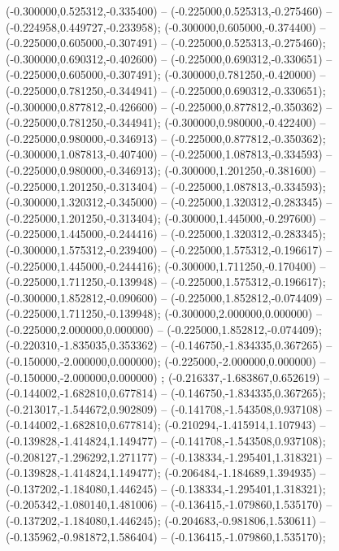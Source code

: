 (-0.300000,0.525312,-0.335400) -- (-0.225000,0.525313,-0.275460) -- (-0.224958,0.449727,-0.233958);
 (-0.300000,0.605000,-0.374400) -- (-0.225000,0.605000,-0.307491) -- (-0.225000,0.525313,-0.275460);
 (-0.300000,0.690312,-0.402600) -- (-0.225000,0.690312,-0.330651) -- (-0.225000,0.605000,-0.307491);
 (-0.300000,0.781250,-0.420000) -- (-0.225000,0.781250,-0.344941) -- (-0.225000,0.690312,-0.330651);
 (-0.300000,0.877812,-0.426600) -- (-0.225000,0.877812,-0.350362) -- (-0.225000,0.781250,-0.344941);
 (-0.300000,0.980000,-0.422400) -- (-0.225000,0.980000,-0.346913) -- (-0.225000,0.877812,-0.350362);
 (-0.300000,1.087813,-0.407400) -- (-0.225000,1.087813,-0.334593) -- (-0.225000,0.980000,-0.346913);
 (-0.300000,1.201250,-0.381600) -- (-0.225000,1.201250,-0.313404) -- (-0.225000,1.087813,-0.334593);
 (-0.300000,1.320312,-0.345000) -- (-0.225000,1.320312,-0.283345) -- (-0.225000,1.201250,-0.313404);
 (-0.300000,1.445000,-0.297600) -- (-0.225000,1.445000,-0.244416) -- (-0.225000,1.320312,-0.283345);
 (-0.300000,1.575312,-0.239400) -- (-0.225000,1.575312,-0.196617) -- (-0.225000,1.445000,-0.244416);
 (-0.300000,1.711250,-0.170400) -- (-0.225000,1.711250,-0.139948) -- (-0.225000,1.575312,-0.196617);
 (-0.300000,1.852812,-0.090600) -- (-0.225000,1.852812,-0.074409) -- (-0.225000,1.711250,-0.139948);
 (-0.300000,2.000000,0.000000) -- (-0.225000,2.000000,0.000000) -- (-0.225000,1.852812,-0.074409);
 (-0.220310,-1.835035,0.353362) -- (-0.146750,-1.834335,0.367265) -- (-0.150000,-2.000000,0.000000);
 (-0.225000,-2.000000,0.000000) -- (-0.150000,-2.000000,0.000000) ;
 (-0.216337,-1.683867,0.652619) -- (-0.144002,-1.682810,0.677814) -- (-0.146750,-1.834335,0.367265);
 (-0.213017,-1.544672,0.902809) -- (-0.141708,-1.543508,0.937108) -- (-0.144002,-1.682810,0.677814);
 (-0.210294,-1.415914,1.107943) -- (-0.139828,-1.414824,1.149477) -- (-0.141708,-1.543508,0.937108);
 (-0.208127,-1.296292,1.271177) -- (-0.138334,-1.295401,1.318321) -- (-0.139828,-1.414824,1.149477);
 (-0.206484,-1.184689,1.394935) -- (-0.137202,-1.184080,1.446245) -- (-0.138334,-1.295401,1.318321);
 (-0.205342,-1.080140,1.481006) -- (-0.136415,-1.079860,1.535170) -- (-0.137202,-1.184080,1.446245);
 (-0.204683,-0.981806,1.530611) -- (-0.135962,-0.981872,1.586404) -- (-0.136415,-1.079860,1.535170);
